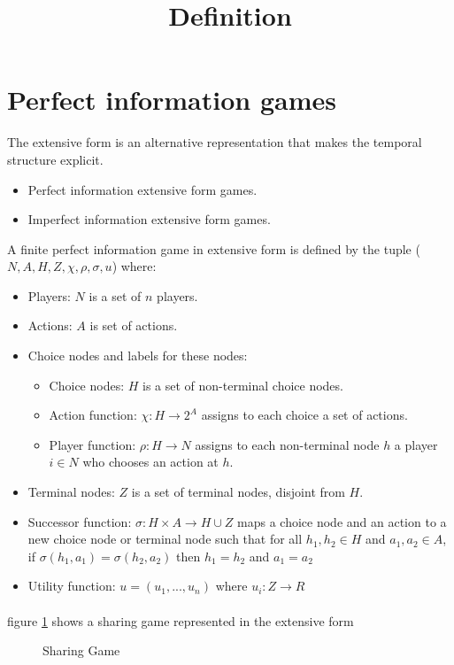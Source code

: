 \section{Perfect information games}{The extensive form is an alternative representation that makes the temporal structure explicit.}
\begin{itemize}
\item{Perfect information extensive form games.}
\item{Imperfect information extensive form games.}
\end{itemize}
\title {\textbf{Definition}} A finite perfect information game in extensive form is defined by the tuple ($N, A, H, Z,\chi ,\rho, \sigma, u $)
where:
\begin{itemize}
\item{Players: $N$ is a set of $n$ players.}
\item{Actions: $A$ is set of actions.}
\item{Choice nodes and labels for these nodes: }
\begin{itemize}
\item{Choice nodes: $H$ is a set of non-terminal choice nodes.}
\item{Action function: $\chi : H \to 2^A $ assigns to each choice a set of actions.}
\item{Player function: $\rho : H \to N$ assigns to each non-terminal node $h$ a player $i \in N$ who chooses an action at $h$.}
\end{itemize}
\item{Terminal nodes: $Z$ is a set of terminal nodes, disjoint from $H$.}
\item{Successor function: $\sigma : H \times A \to H \cup Z$ maps a choice node and an action to a new choice node or terminal node such that for all $h_1, h_2 \in H$ and $a_1, a_2 \in A$, if $\sigma(h_1, a_1) = \sigma(h_2, a_2)$ then $h_1  = h_2$  and $a_1 = a_2$} 
\item{Utility function: $u = (u_1,...,u_n)$ where $u_i : Z \to R$
}
\end{itemize} 
\paragraph{}figure \ref{fig:scaled_diss} shows a sharing game represented in the extensive form
\begin{figure}[h]
 
  \centering
  \caption{Sharing Game\label{fig:scaled_diss}}
\end{figure}
